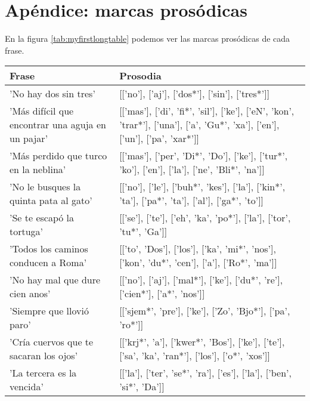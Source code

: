 \chapter*{{\small Apéndice: marcas prosódicas}}
\footnotesize En la figura \ref{tab:myfirstlongtable} podemos ver las marcas prosódicas de cada frase.

\centering
\begin{longtable}{| p{} | p{} |} 
\hline
\textbf{Frase}  & \textbf{Prosodia}  \\ \hline

'No hay dos sin tres' & [['no'], ['aj'], ['dos*'], ['sin'], ['tres*']] \\ \hline
'Más difícil que encontrar una aguja en un pajar' & [['mas'], ['di', 'fi*', 'sil'], ['ke'], ['eN', 'kon', 'trar*'], ['una'], ['a', 'Gu*', 'xa'], ['en'], ['un'], ['pa', 'xar*']] \\ \hline
'Más perdido que turco en la neblina' & [['mas'], ['per', 'Di*', 'Do'], ['ke'], ['tur*', 'ko'], ['en'], ['la'], ['ne', 'Bli*', 'na']] \\ \hline
'No le busques la quinta pata al gato' & [['no'], ['le'], ['buh*', 'kes'], ['la'], ['kin*', 'ta'], ['pa*', 'ta'], ['al'], ['ga*', 'to']] \\ \hline
'Se te escapó la tortuga' & [['se'], ['te'], ['eh', 'ka', 'po*'], ['la'], ['tor', 'tu*', 'Ga']] \\ \hline
'Todos los caminos conducen a Roma' & [['to', 'Dos'], ['los'], ['ka', 'mi*', 'nos'], ['kon', 'du*', 'cen'], ['a'], ['Ro*', 'ma']] \\ \hline
'No hay mal que dure cien anos' & [['no'], ['aj'], ['mal*'], ['ke'], ['du*', 're'], ['cien*'], ['a*', 'nos']] \\ \hline
'Siempre que llovió paro' & [['sjem*', 'pre'], ['ke'], ['Zo', 'Bjo*'], ['pa', 'ro*']] \\ \hline
'Cría cuervos que te sacaran los ojos' & [['krj*', 'a'], ['kwer*', 'Bos'], ['ke'], ['te'], ['sa', 'ka', 'ran*'], ['los'], ['o*', 'xos']] \\ \hline
'La tercera es la vencida' & [['la'], ['ter', 'se*', 'ra'], ['es'], ['la'], ['ben', 'si*', 'Da']] \\ \hline

\end{longtable}
